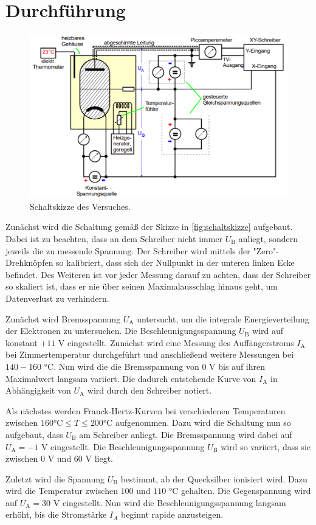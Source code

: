 \section{Durchführung}
\label{sec:Durchführung}

\begin{figure}
    \centering
    \includegraphics[width=\textwidth]{content/schaltskizze.PNG}
    \caption{Schaltskizze des Versuches\cite{V601}.}
    \label{fig:schaltskizze}
\end{figure}

Zunächst wird die Schaltung gemäß der Skizze in \autoref{fig:schaltskizze} aufgebaut. 
Dabei ist zu beachten, dass an dem Schreiber nicht immer $U_\text{B}$ anliegt, sondern jeweils die zu messende Spannung.
Der Schreiber wird mittels der "Zero"-Drehknöpfen so kalibriert, dass sich der Nullpunkt in der unteren linken Ecke befindet. 
Des Weiteren ist vor jeder Messung darauf zu achten, dass der Schreiber so skaliert ist, 
dass er nie über seinen Maximalausschlag hinaus geht, um Datenverlust zu verhindern.

Zunächst wird Bremsspannung $U_\text{A}$ untersucht, um die integrale Energieverteilung der Elektronen zu untersuchen.
Die Beschleunigungsspannung $U_\text{B}$ wird auf konstant $+11$ V eingestellt. 
Zunächst wird eine Messung des Auffängerstroms $I_\text{A}$ bei Zimmertemperatur durchgeführt und anschließend weitere Messungen bei $140 - 160$ °C.
Nun wird die die Bremsspannung von 0 V bis auf ihren Maximalwert langsam variiert. 
Die dadurch entstehende Kurve von $I_\text{A}$ in Abhängigkeit von $U_\text{A}$ wird durch den Schreiber notiert.

Als nächstes werden Franck-Hertz-Kurven bei verschiedenen Temperaturen zwischen $160 \text{°C} \leq T \leq 200 \text{°C}$ aufgenommen. 
Dazu wird die Schaltung nun so aufgebaut, dass $U_\text{B}$ am Schreiber anliegt.
Die Bremsspannung wird dabei auf $U_\text{A} = -1$ V eingestellt. 
Die Beschleunigungsspannung $U_\text{B}$ wird so variiert, dass sie zwischen 0 V und 60 V liegt.

Zuletzt wird die Spannung $U_\text{B}$ bestimmt, ab der Quecksilber ionisiert wird.
 Dazu wird die Temperatur zwischen $100$ und $110$ °C gehalten. Die Gegenspannung wird auf $U_\text{A} = 30$ V eingestellt.
Nun wird die Beschleunigungsspannung langsam erhöht, bis die Stromstärke $I_A$ beginnt rapide anzusteigen.